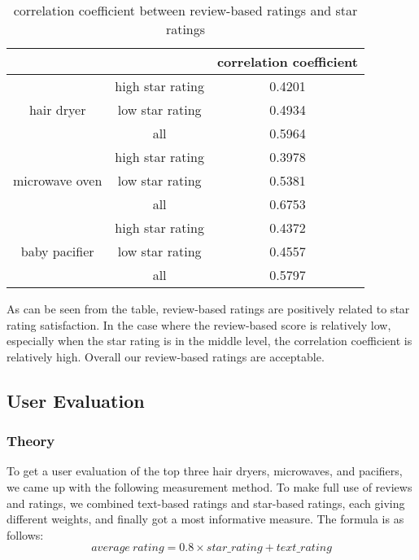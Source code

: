 \documentclass{mcmthesis}
\begin{document}
	
	
	\begin{table}[h]
		\begin{center} 
			\caption{correlation coefficient between review-based ratings and star ratings}
			\begin{tabular}{|c|c|c|}
				\hline
				&                  & correlation coefficient \\ \hline
				\multirow{3}{*}{hair dryer}     & high star rating & 0.4201                  \\ \cline{2-3} 
				& low star rating  & 0.4934                  \\ \cline{2-3} 
				& all              & 0.5964                  \\ \hline
				\multirow{3}{*}{microwave oven} & high star rating & 0.3978                  \\ \cline{2-3} 
				& low star rating  & 0.5381                  \\ \cline{2-3} 
				& all              & 0.6753                  \\ \hline
				\multirow{3}{*}{baby pacifier}  & high star rating & 0.4372                  \\ \cline{2-3} 
				& low star rating  & 0.4557                  \\ \cline{2-3} 
				& all              & 0.5797                  \\ \hline
			\end{tabular}
		\end{center}
	\end{table}
	
	
	As can be seen from the table, review-based ratings are positively related to star rating satisfaction. In the case where the review-based score is relatively low, especially when the star rating is in the middle level, the correlation coefficient is relatively high. Overall our review-based ratings are acceptable.
	
	
	\subsection{User Evaluation}
	\subsubsection{Theory}
	To get a user evaluation of the top three hair dryers, microwaves, and pacifiers, we came up with the following measurement method. To make full use of reviews and ratings, we combined text-based ratings and star-based ratings, each giving different weights, and finally got a most informative measure. The formula is as follows:
	$$
	average\ rating = 0.8 \times star\_rating + text\_rating
	$$
	
\end{document}
